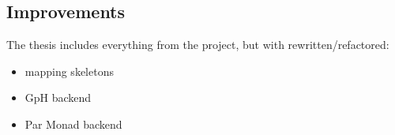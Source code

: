 \subsection{Improvements}

\begin{frame}[fragile]{}
The thesis includes everything from the project, but with rewritten/refactored:
\\
\begin{itemize}
\item mapping skeletons
\item GpH backend
\item Par Monad backend 
\end{itemize}
\end{frame}